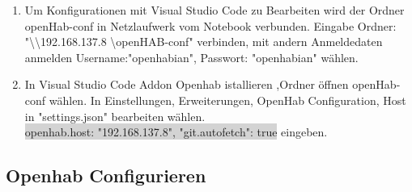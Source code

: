 \begin{enumerate}
\item Um Konfigurationen mit Visual Studio Code zu Bearbeiten wird der Ordner openHab-conf in Netzlaufwerk vom Notebook verbunden. Eingabe Ordner: "\textbackslash \textbackslash 192.168.137.8 \textbackslash openHAB-conf" verbinden, mit andern Anmeldedaten anmelden Username:"openhabian", Passwort: "openhabian" wählen.

\item In Visual Studio Code Addon Openhab istallieren ,Ordner öffnen openHab-conf wählen. In Einstellungen, Erweiterungen, OpenHab Configuration, Host in "settings.json" bearbeiten wählen. \\
\colorbox{lightgray}{openhab.host: "192.168.137.8",
	"git.autofetch": true} eingeben.
   
   
 \end{enumerate}
\subsection{Openhab Configurieren}

